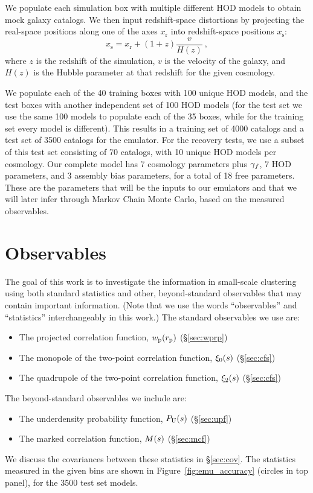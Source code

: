 We populate each simulation box with multiple different HOD models to obtain mock galaxy catalogs.
We then input redshift-space distortions by projecting the real-space positions along one of the axes $x_\mathrm{r}$ into redshift-space positions $x_\mathrm{s}$:
\begin{equation}
    x_\mathrm{s} = x_\mathrm{r} + (1+z)\frac{v}{H(z)} ~,
\end{equation}
where $z$ is the redshift of the simulation, $v$ is the velocity of the galaxy, and $H(z)$ is the Hubble parameter at that redshift for the given cosmology.

We populate each of the 40 training boxes with 100 unique HOD models, and the test boxes with another independent set of 100 HOD models (for the test set we use the same 100 models to populate each of the 35 boxes, while for the training set every model is different).
This results in a training set of 4000 catalogs and a test set of 3500 catalogs for the emulator. 
For the recovery tests, we use a subset of this test set consisting of 70 catalogs, with 10 unique HOD models per cosmology.
Our complete model has 7 cosmology parameters plus $\gamma_f$, 7 HOD parameters, and 3 assembly bias parameters, for a total of 18 free parameters.
These are the parameters that will be the inputs to our emulators and that we will later infer through Markov Chain Monte Carlo, based on the measured observables.



\section{Observables}
\label{sec:observables}

The goal of this work is to investigate the information in small-scale clustering using both standard statistics and other, beyond-standard observables that may contain important information.
(Note that we use the words ``observables'' and ``statistics'' interchangeably in this work.)
The standard observables we use are:
\begin{itemize}
    \item The projected correlation function, $w_\mathrm{p}(r_\mathrm{p})$ (\S\ref{sec:wprp})
    \item The monopole of the two-point correlation function, $\xi_0(s)$ (\S\ref{sec:cfs})
    \item The quadrupole of the two-point correlation function, $\xi_2(s)$ (\S\ref{sec:cfs})
\end{itemize}
The beyond-standard observables we include are:
\begin{itemize}
    \item The underdensity probability function, $P_\mathrm{U}(s)$ (\S\ref{sec:upf})
    \item The marked correlation function, $M(s)$ (\S\ref{sec:mcf})
\end{itemize}
We discuss the covariances between these statistics in \S\ref{sec:cov}.
The statistics measured in the given bins are shown in Figure~\ref{fig:emu_accuracy} (circles in top panel), for the 3500 test set models.

